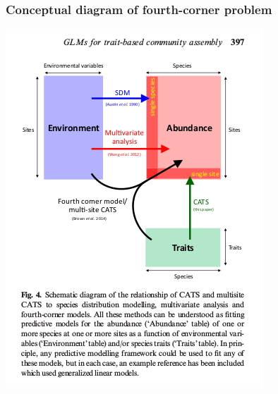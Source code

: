 \documentclass{beamer}
\begin{document}
\begin{frame}
  \frametitle{Conceptual diagram of fourth-corner problem}

  \begin{center}
    \includegraphics[width=\textwidth,height=0.7\textheight,keepaspectratio=true]{figure/warton_4corner}
  \end{center}

\end{frame}
\end{document}
